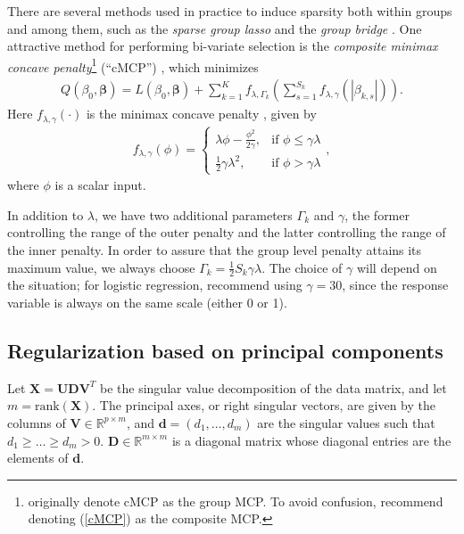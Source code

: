 \documentclass[11pt]{article}
\newcommand{\citeay}[1]{\citeauthor{#1} \citeyear{#1}}
\begin{document}
There are several methods used in practice to induce sparsity both within groups and among them, such as the \textit{sparse group lasso} \cite{simon2013sparse} and the \textit{group bridge} \cite{huang2009group}. One attractive method for performing bi-variate selection is the \textit{composite minimax concave penalty}\footnote{\citeay{breheny2009penalized} originally denote cMCP as the group MCP. To avoid confusion, \citeay{huang2012selective} recommend denoting (\ref{cMCP}) as the composite MCP.} (``cMCP'') \cite{breheny2009penalized}, which minimizes
\begin{align}
    \label{cMCP}
    Q(\beta_0, \bm{\beta}) = L(\beta_0, \bm{\beta}) + \sum_{k=1}^K f_{\lambda, \Gamma_k} \left( \sum_{s=1}^{S_k} f_{\lambda, \gamma}(|\beta_{k,s}|) \right).
\end{align}
Here $f_{\lambda, \gamma}(\cdot)$ is the minimax concave penalty \cite{zhang2010nearly}, given by 
\begin{align}
    \label{MCPpenalty}
    f_{\lambda, \gamma}(\phi) = \begin{cases}
        \lambda \phi - \frac{\phi^2}{2 \gamma}, & \text{if } \phi \le \gamma \lambda \\
        \frac{1}{2} \gamma \lambda^2, & \text{if } \phi > \gamma \lambda
    \end{cases},
\end{align}
where $\phi$ is a scalar input. %


In addition to $\lambda$, we have two additional parameters $\Gamma_k$ and $\gamma$, the former controlling the range of the outer penalty and the latter controlling the range of the inner penalty. In order to assure that the group level penalty attains its maximum value, we always choose $\Gamma_k = \frac{1}{2} S_k \gamma \lambda$. The choice of $\gamma$ will depend on the situation; for logistic regression, \citeay{breheny2009penalized} recommend using $\gamma = 30$, since the response variable is always on the same scale (either 0 or 1). 


\subsection{Regularization based on principal components}

Let $\mathbf{X} = \mathbf{U} \mathbf{D} \mathbf{V}^T$ be the singular value decomposition of the data matrix, and let $m = \mathrm{rank}(\mathbf{X})$. The principal axes, or right singular vectors, are given by the columns of $\mathbf{V} \in \mathbb{R}^{p \times m}$, and $\bm{d} = (d_1, \ldots, d_m)$ are the singular values such that $d_1 \ge \ldots \ge d_m > 0$. $\mathbf{D} \in \mathbb{R}^{m \times m}$ is a diagonal matrix whose diagonal entries are the elements of $\bm{d}$. 
\end{document}
